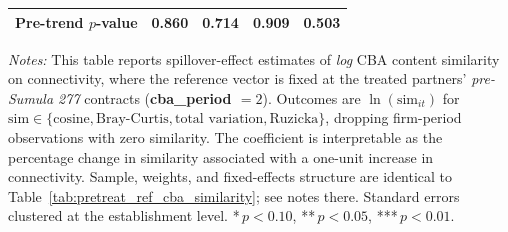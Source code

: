 \begin{table}[H]
\begin{tabular}{lcccc}
Pre-trend $p$-value & 0.860 & 0.714 & 0.909 & 0.503 \\
\hline\hline
\end{tabular}
\begin{minipage}{\linewidth}
\smallskip
\scriptsize\textit{Notes:} This table reports spillover-effect estimates of \emph{log} CBA content similarity on connectivity, where the reference vector is fixed at the treated partners' \textit{pre-Sumula 277} contracts (\textbf{cba\_period $= 2$}). Outcomes are $\ln(\text{sim}_{it})$ for $\text{sim} \in \{\text{cosine}, \text{Bray-Curtis}, \text{total variation}, \text{Ruzicka}\}$, dropping firm-period observations with zero similarity. The coefficient is interpretable as the percentage change in similarity associated with a one-unit increase in connectivity. Sample, weights, and fixed-effects structure are identical to Table~\ref{tab:pretreat_ref_cba_similarity}; see notes there. Standard errors clustered at the establishment level. *\,$p<0.10$, **\,$p<0.05$, ***\,$p<0.01$.
\end{minipage}
\end{table}
